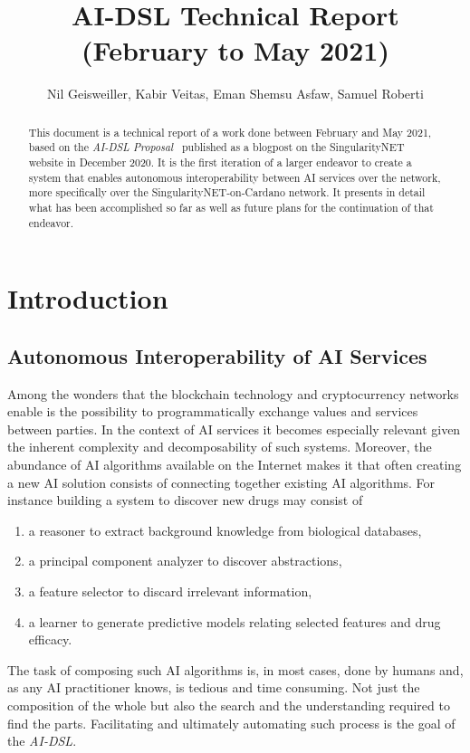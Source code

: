 \documentclass[]{report}
\begin{document}
\title{AI-DSL Technical Report (February to May 2021)}
\author{Nil Geisweiller, Kabir Veitas, Eman Shemsu Asfaw, Samuel Roberti}
\maketitle

\begin{abstract}
This document is a technical report of a work done between February
and May 2021, based on the \emph{AI-DSL
Proposal}~\cite{GoertzelGeisweillerBlog} published as a blogpost on
the SingularityNET website in December 2020.  It is the first
iteration of a larger endeavor to create a system that enables
autonomous interoperability between AI services over the network, more
specifically over the SingularityNET-on-Cardano network.  It presents
in detail what has been accomplished so far as well as future plans
for the continuation of that endeavor.
\end{abstract}

\tableofcontents

\chapter{Introduction}
\section{Autonomous Interoperability of AI Services}
Among the wonders that the blockchain technology and cryptocurrency
networks enable is the possibility to programmatically exchange values
and services between parties.  In the context of AI services it
becomes especially relevant given the inherent complexity and
decomposability of such systems.  Moreover, the abundance of AI
algorithms available on the Internet makes it that often creating a
new AI solution consists of connecting together existing AI
algorithms.  For instance building a system to discover new drugs may
consist of
\begin{enumerate}
\item a reasoner to extract background knowledge from biological
  databases,
\item a principal component analyzer to discover abstractions,
\item a feature selector to discard irrelevant information,
\item a learner to generate predictive models relating selected
  features and drug efficacy.
\end{enumerate}
The task of composing such AI algorithms is, in most cases, done by
humans and, as any AI practitioner knows, is tedious and time
consuming.  Not just the composition of the whole but also the search
and the understanding required to find the parts.  Facilitating and
ultimately automating such process is the goal of the \emph{AI-DSL}.
\end{document}
